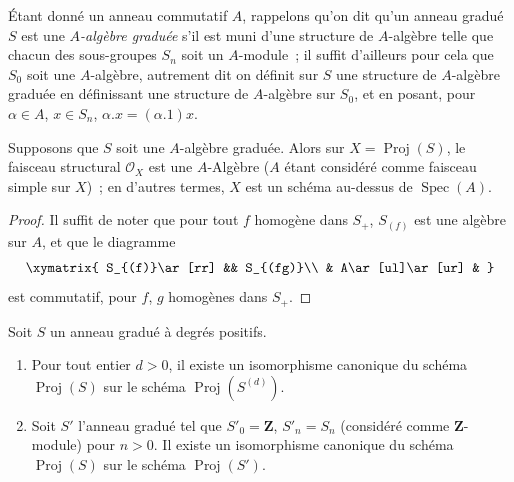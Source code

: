 \begin{env}[2.4.5]
\label{II.2.4.5-fr}
Étant donné un anneau commutatif $A$, rappelons qu'on dit qu'un anneau
gradué $S$ est une \emph{$A$-algèbre graduée} s'il est muni d'une structure
de $A$-algèbre telle que chacun des sous-groupes $S_n$ soit un $A$-module~;
il suffit d'ailleurs pour cela que $S_0$ soit
une $A$-algèbre, autrement dit on définit sur $S$ une structure de
$A$-algèbre graduée en définissant une structure de $A$-algèbre sur $S_0$,
et en posant, pour $\alpha\in A$, $x\in S_n$,
$\alpha.x=(\alpha.1)x$.
\end{env}

\begin{proposition}[2.4.6]
\label{II.2.4.6-fr}
Supposons que $S$ soit une $A$-algèbre graduée. Alors sur
$X=\operatorname{Proj}(S)$, le faisceau structural $\mathcal{O}_X$ est une
$A$-Algèbre ($A$ étant considéré comme faisceau simple sur $X$)~; en
d'autres termes, $X$ est un schéma au-dessus de $\operatorname{Spec}(A)$.
\end{proposition}

\begin{proof}
Il suffit de noter que pour tout $f$ homogène dans $S_+$, $S_{(f)}$ est une
algèbre sur $A$, et que le diagramme
\[
  \xymatrix{
    S_{(f)}\ar[rr] && S_{(fg)}\\
    & A\ar[ul]\ar[ur] &
  }
\]
est commutatif, pour $f$, $g$ homogènes dans $S_+$.
\end{proof}

\begin{proposition}[2.4.7]
\label{II.2.4.7-fr}
Soit $S$ un anneau gradué à degrés positifs.
\begin{enumerate}
  \item[\rm(i)] Pour tout entier $d>0$, il existe un isomorphisme canonique
    du schéma $\operatorname{Proj}(S)$ sur le schéma
    $\operatorname{Proj}(S^{(d)})$.
  \item[\rm(ii)] Soit $S'$ l'anneau gradué tel que $S'_0=\mathbf{Z}$,
    $S'_n=S_n$ (considéré comme $\mathbf{Z}$-module) pour $n>0$. Il existe un
    isomorphisme canonique du schéma $\operatorname{Proj}(S)$ sur le schéma
    $\operatorname{Proj}(S')$.
\end{enumerate}
\end{proposition}

